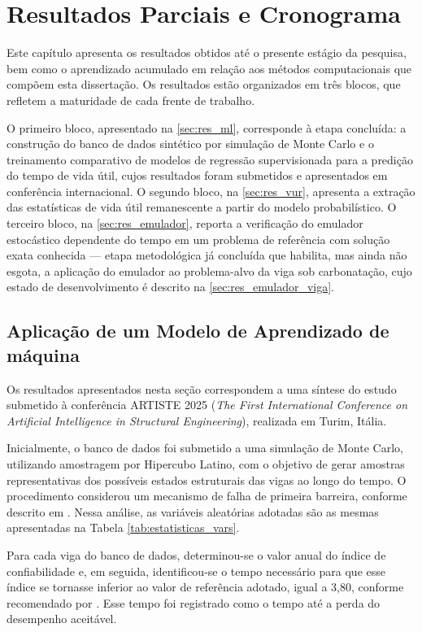 \chapter{Resultados Parciais e Cronograma} \label{cap:resultados}

Este capítulo apresenta os resultados obtidos até o presente estágio da pesquisa, bem como o aprendizado acumulado em relação aos métodos computacionais que compõem esta dissertação. Os resultados estão organizados em três blocos, que refletem a maturidade de cada frente de trabalho.

O primeiro bloco, apresentado na \autoref{sec:res_ml}, corresponde à etapa concluída: a construção do banco de dados sintético por simulação de Monte Carlo e o treinamento comparativo de modelos de regressão supervisionada para a predição do tempo de vida útil, cujos resultados foram submetidos e apresentados em conferência internacional. O segundo bloco, na \autoref{sec:res_vur}, apresenta a extração das estatísticas de vida útil remanescente a partir do modelo probabilístico. O terceiro bloco, na \autoref{sec:res_emulador}, reporta a verificação do emulador estocástico dependente do tempo em um problema de referência com solução exata conhecida --- etapa metodológica já concluída que habilita, mas ainda não esgota, a aplicação do emulador ao problema-alvo da viga sob carbonatação, cujo estado de desenvolvimento é descrito na \autoref{sec:res_emulador_viga}.

\section{Aplicação de um Modelo de Aprendizado de máquina} \label{sec:res_ml}

Os resultados apresentados nesta seção correspondem a uma síntese do estudo submetido à conferência ARTISTE 2025 (\textit{The First International Conference on Artificial Intelligence in Structural Engineering}), realizada em Turim, Itália.

Inicialmente, o banco de dados foi submetido a uma simulação de Monte Carlo, utilizando amostragem por Hipercubo Latino, com o objetivo de gerar amostras representativas dos possíveis estados estruturais das vigas ao longo do tempo. O procedimento considerou um mecanismo de falha de primeira barreira, conforme descrito em \textcite{Rodrigues2025}. Nessa análise, as variáveis aleatórias adotadas são as mesmas apresentadas na Tabela \ref{tab:estatisticas_vars}.

Para cada viga do banco de dados, determinou-se o valor anual do índice de confiabilidade e, em seguida, identificou-se o tempo necessário para que esse índice se tornasse inferior ao valor de referência adotado, igual a 3,80, conforme recomendado por \textcite{JCSS2001}. Esse tempo foi registrado como o tempo até a perda do desempenho aceitável.

